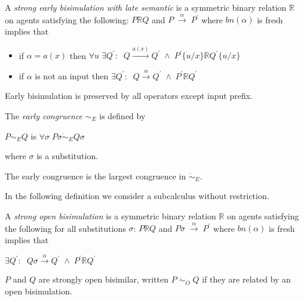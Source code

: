 \begin{definition}
  A \emph{strong early bisimulation with late semantic} is a symmetric binary relation $\mathbb{R}$ on agents satisfying the following: $P\mathbb{R} Q$ and $P\; \xrightarrow{\alpha}\; P^{'}$ where $bn(\alpha)$ is fresh implies that
  \begin{itemize}
    \item
      if $\alpha=a(x)$ then $\forall u\; \exists Q^{'}:\;\; Q\xrightarrow{a(x)}Q^{'}\; \wedge\; P^{'}\{u/x\}\mathbb{R}Q^{'}\{u/x\}$
    \item
      if $\alpha$ is not an input then $\exists Q^{'}:\;\; Q\xrightarrow{\alpha}Q^{'}\; \wedge\; P^{'}\mathbb{R}Q^{'}$
  \end{itemize}
\end{definition}

Early bisimulation is preserved by all operators except input prefix.

\begin{definition}
  The \emph{early congruence} $\sim_{E}$ is defined by
  \begin{center}
    $P\sim_{E} Q$ is $\forall \sigma\; P\sigma \dot{\sim}_{E} Q\sigma$
  \end{center}
  where $\sigma$ is a substitution.
\end{definition}

The early congruence is the largest congruence in $\dot{\sim}_{E}$. 

In the following definition we consider a subcalculus without restriction. 
\begin{definition}
  A \emph{strong open bisimulation} is a symmetric binary relation $\mathbb{R}$ on agents satisfying the following for all substitutions $\sigma$: $P\mathbb{R} Q$ and $P\sigma\; \xrightarrow{\alpha}\; P^{'}$ where $bn(\alpha)$ is fresh implies that
  \begin{center}
    $\exists Q^{'}:\;\; Q\sigma\xrightarrow{\alpha}Q^{'}\; \wedge\; P^{'}\mathbb{R}Q^{'}$
  \end{center}
  $P$ and $Q$ are strongly open bisimilar, written $P\; \dot{\sim}_{O}\; Q$ if they are related by an open bisimulation.
\end{definition}



